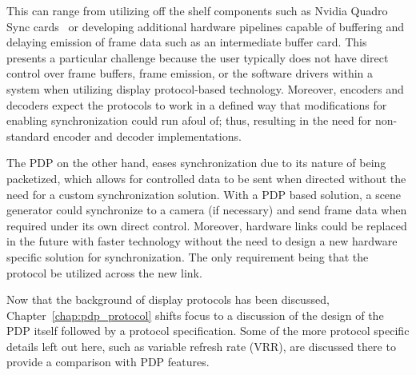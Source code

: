     This can range from utilizing off the shelf components such as Nvidia Quadro Sync cards~\cite{NVIDIA2020_2} or developing additional hardware pipelines capable of buffering and delaying emission of frame data such as an intermediate buffer card. This presents a particular challenge because the user typically does not have direct control over frame buffers, frame emission, or the software drivers within a system when utilizing display protocol-based technology. Moreover, encoders and decoders expect the protocols to work in a defined way that modifications for enabling synchronization could run afoul of; thus, resulting in the need for non-standard encoder and decoder implementations.

    The PDP on the other hand, eases synchronization due to its nature of being packetized, which allows for controlled data to be sent when directed without the need for a custom synchronization solution. With a PDP based solution, a scene generator could synchronize to a camera (if necessary) and send frame data when required under its own direct control. Moreover, hardware links could be replaced in the future with faster technology without the need to design a new hardware specific solution for synchronization. The only requirement being that the protocol be utilized across the new link.

    Now that the background of display protocols has been discussed, Chapter~\ref{chap:pdp_protocol} shifts focus to a discussion of the design of the PDP itself followed by a protocol specification. Some of the more protocol specific details left out here, such as variable refresh rate (VRR), are discussed there to provide a comparison with PDP features.
